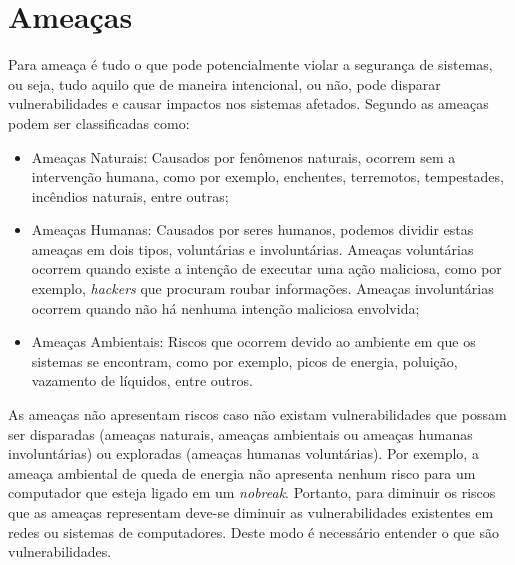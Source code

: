 
\section{Ameaças}
\label{ameaças}
Para  ameaça é tudo o que pode potencialmente violar a segurança de sistemas, ou seja, tudo aquilo que de maneira intencional, ou não, pode disparar vulnerabilidades e causar impactos nos sistemas afetados.
Segundo  as ameaças podem ser classificadas como:
\begin{itemize}
    \item Ameaças Naturais: Causados por fenômenos naturais, ocorrem sem a intervenção humana, como por exemplo, enchentes, terremotos, tempestades, incêndios naturais, entre outras;
    \item Ameaças Humanas: Causados por seres humanos, podemos dividir estas ameaças em dois tipos, voluntárias e involuntárias. Ameaças voluntárias ocorrem quando existe a intenção de executar uma ação maliciosa, como por exemplo, \textit{hackers} que procuram roubar informações. Ameaças involuntárias ocorrem quando não há nenhuma intenção maliciosa envolvida; %
    \item Ameaças Ambientais: Riscos que ocorrem devido ao ambiente em que os sistemas se encontram, como por exemplo, picos de energia, poluição, vazamento de líquidos, entre outros.
\end{itemize}
As ameaças não apresentam riscos caso não existam vulnerabilidades que possam ser disparadas (ameaças naturais, ameaças ambientais ou ameaças humanas involuntárias) ou exploradas (ameaças humanas voluntárias). Por exemplo, a ameaça ambiental de queda de energia não apresenta nenhum risco para um computador que esteja ligado em um \textit{nobreak}. Portanto, para diminuir os riscos que as ameaças representam  deve-se diminuir as vulnerabilidades existentes em redes ou sistemas de computadores. Deste modo é necessário entender o que são vulnerabilidades.



